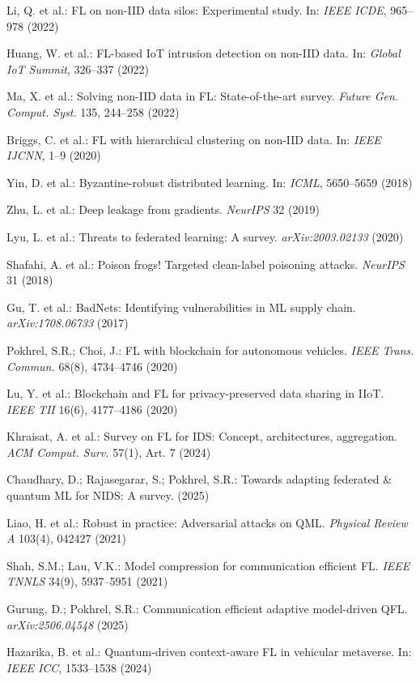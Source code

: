 \documentclass[a4paper]{article}
\begin{document}
\begin{enumerate}[leftmargin=0.8cm, itemsep=0pt, parsep=0pt, label={[\arabic*]}]
\item Li, Q. et al.: FL on non-IID data silos: Experimental study. In: \textit{IEEE ICDE}, 965--978 (2022)
\item Huang, W. et al.: FL-based IoT intrusion detection on non-IID data. In: \textit{Global IoT Summit}, 326--337 (2022)
\item Ma, X. et al.: Solving non-IID data in FL: State-of-the-art survey. \textit{Future Gen. Comput. Syst.} 135, 244--258 (2022)
\item Briggs, C. et al.: FL with hierarchical clustering on non-IID data. In: \textit{IEEE IJCNN}, 1--9 (2020)
\item Yin, D. et al.: Byzantine-robust distributed learning. In: \textit{ICML}, 5650--5659 (2018)
\item Zhu, L. et al.: Deep leakage from gradients. \textit{NeurIPS} 32 (2019)
\item Lyu, L. et al.: Threats to federated learning: A survey. \textit{arXiv:2003.02133} (2020)
\item Shafahi, A. et al.: Poison frogs! Targeted clean-label poisoning attacks. \textit{NeurIPS} 31 (2018)
\item Gu, T. et al.: BadNets: Identifying vulnerabilities in ML supply chain. \textit{arXiv:1708.06733} (2017)
\item Pokhrel, S.R.; Choi, J.: FL with blockchain for autonomous vehicles. \textit{IEEE Trans. Commun.} 68(8), 4734--4746 (2020)
\item Lu, Y. et al.: Blockchain and FL for privacy-preserved data sharing in IIoT. \textit{IEEE TII} 16(6), 4177--4186 (2020)
\item Khraisat, A. et al.: Survey on FL for IDS: Concept, architectures, aggregation. \textit{ACM Comput. Surv.} 57(1), Art. 7 (2024)
\item Chaudhary, D.; Rajasegarar, S.; Pokhrel, S.R.: Towards adapting federated \& quantum ML for NIDS: A survey. (2025)
\item Liao, H. et al.: Robust in practice: Adversarial attacks on QML. \textit{Physical Review A} 103(4), 042427 (2021)
\item Shah, S.M.; Lau, V.K.: Model compression for communication efficient FL. \textit{IEEE TNNLS} 34(9), 5937--5951 (2021)
\item Gurung, D.; Pokhrel, S.R.: Communication efficient adaptive model-driven QFL. \textit{arXiv:2506.04548} (2025)
\item Hazarika, B. et al.: Quantum-driven context-aware FL in vehicular metaverse. In: \textit{IEEE ICC}, 1533--1538 (2024)
\end{enumerate}
\end{document}
